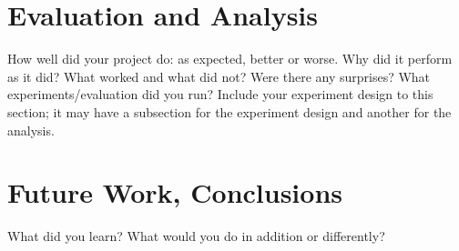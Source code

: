 \documentclass[letterpaper]{article}
\begin{document}
\section{Evaluation and Analysis}
How well did your project do: as expected, better or worse. Why did it perform as it did? What worked and what did not? Were there any surprises? What experiments/evaluation did you run? Include your experiment design to this section; it may have a subsection for the experiment design and another for the analysis.

\section{Future Work, Conclusions}
What did you learn? What would you do in addition or differently? \cite{Torre2008} \cite{Young2013} \cite{Shapiro1982}





\end{document}
